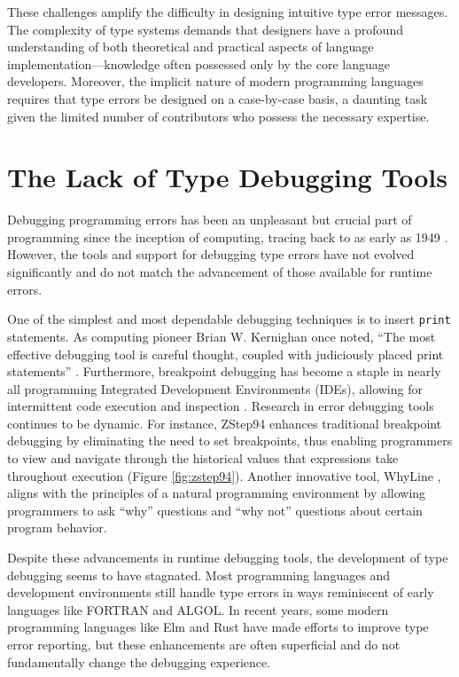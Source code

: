 These challenges amplify the difficulty in designing intuitive type error messages. The complexity of type systems demands that designers have a profound understanding of both theoretical and practical aspects of language implementation—knowledge often possessed only by the core language developers. Moreover, the implicit nature of modern programming languages requires that type errors be designed on a case-by-case basis, a daunting task given the limited number of contributors who possess the necessary expertise.

\section{The Lack of Type Debugging Tools}

Debugging programming errors has been an unpleasant but crucial part of programming since the inception of computing, tracing back to as early as 1949 \cite{Campbell-Kelly1992-rn}. However, the tools and support for debugging type errors have not evolved significantly and do not match the advancement of those available for runtime errors.

One of the simplest and most dependable debugging techniques is to insert \texttt{print} statements. As computing pioneer Brian W. Kernighan once noted, ``The most effective debugging tool is careful thought, coupled with judiciously placed print statements'' \cite{Kernighan1978-xs}. Furthermore, breakpoint debugging has become a staple in nearly all programming Integrated Development Environments (IDEs), allowing for intermittent code execution and inspection \cite{fig:breakpoint}. Research in error debugging tools continues to be dynamic. For instance, ZStep94 \cite{Lieberman1995-lg} enhances traditional breakpoint debugging by eliminating the need to set breakpoints, thus enabling programmers to view and navigate through the historical values that expressions take throughout execution (Figure \ref{fig:zstep94}). Another innovative tool, WhyLine \cite{Ko2009-uf}, aligns with the principles of a natural programming environment \cite{Myers2004-fy} by allowing programmers to ask ``why'' questions and ``why not'' questions about certain program behavior.

Despite these advancements in runtime debugging tools, the development of type debugging seems to have stagnated. Most programming languages and development environments still handle type errors in ways reminiscent of early languages like FORTRAN and ALGOL. In recent years, some modern programming languages like Elm and Rust have made efforts to improve type error reporting, but these enhancements are often superficial and do not fundamentally change the debugging experience.


